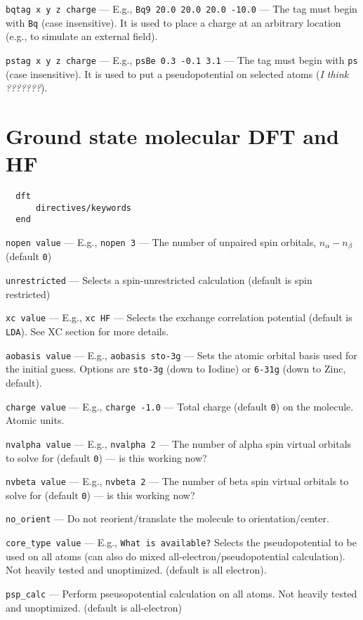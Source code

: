 \documentclass[letterpaper]{book}
\begin{document}
{\tt bqtag x y z charge} --- E.g., {\tt Bq9 20.0 20.0 20.0 -10.0} --- The tag must begin with {\tt Bq} (case insensitive).  It is used to place a charge at an arbitrary location (e.g., to simulate an external field).

{\tt pstag x y z charge} --- E.g., {\tt psBe 0.3 -0.1 3.1} --- The tag must begin with {\tt ps} (case insensitive).  It is used to put a pseudopotential on selected atoms ({\em I think ???????}).


\chapter{Ground state molecular DFT and HF}

\begin{verbatim}
  dft
      directives/keywords
  end
\end{verbatim}

{\tt nopen value} --- E.g., {\tt nopen 3} --- The number of unpaired spin orbitals, $n_\alpha - n_\beta$ (default {\tt 0})

{\tt unrestricted} --- Selects a spin-unrestricted calculation (default is spin restricted)

{\tt xc value} --- E.g., {\tt xc HF} --- Selects the exchange correlation potential (default is {\tt LDA}). See XC section for more details.

{\tt aobasis value} --- E.g., {\tt aobasis sto-3g} --- Sets the atomic orbital basis used for the initial guess.  Options are {\tt sto-3g} (down to Iodine)  or {\tt 6-31g} (down to Zinc, default).  

{\tt charge value} --- E.g., {\tt charge -1.0} --- Total charge (default {\tt 0}) on the molecule. Atomic units.

{\tt nvalpha value} --- E.g., {\tt nvalpha 2} --- The number of alpha spin virtual orbitals to solve for (default {\tt 0}) --- is this working now?

{\tt nvbeta value} --- E.g., {\tt nvbeta 2} --- The number of beta spin virtual orbitals to solve for (default {\tt 0}) --- is this working now?

{\tt no\_orient} --- Do not reorient/translate the molecule to orientation/center.

{\tt core\_type value} --- E.g., {\tt What is available?} Selects the pseudopotential to be used on all atoms (can also do mixed all-electron/pseudopotential calculation).  Not heavily tested and unoptimized. (default is all electron).

{\tt psp\_calc} --- Perform pseusopotential calculation on all atoms.  Not heavily tested and unoptimized. (default is all-electron)
\end{document}
